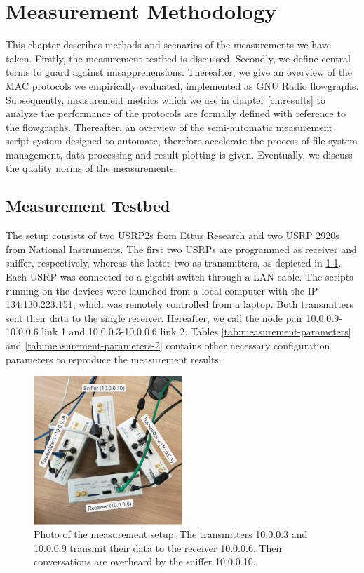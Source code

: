 \chapter{Measurement Methodology}
\label{ch:methodology}

This chapter describes methods and scenarios of the measurements we have taken. Firstly, the measurement testbed is discussed. Secondly, we define central terms to guard against misapprehensions. Thereafter, we give an overview of the MAC protocols we empirically evaluated, implemented as GNU Radio flowgraphs. Subsequently, measurement metrics which we use in chapter \ref{ch:results} to analyze the performance of the protocols are formally defined with reference to the flowgraphs. Thereafter, an overview of the semi-automatic measurement script system designed to automate, therefore accelerate the process of file system management, data processing and result plotting is given. Eventually, we discuss the quality norms of the measurements.

\section{Measurement Testbed}

The setup consists of two USRP2s from Ettus Research and two USRP 2920s from National Instruments. The first two USRPs are programmed as receiver and sniffer, respectively, whereas the latter two as transmitters, as depicted in \ref{fig:measurement-setup}. Each USRP was connected to a gigabit switch through a LAN cable. The scripts running on the devices were launched from a local computer with the IP 134.130.223.151, which was remotely controlled from a laptop. Both transmitters sent their data to the single receiver. Hereafter, we call the node pair 10.0.0.9-10.0.0.6 link 1 and 10.0.0.3-10.0.0.6 link 2. Tables \ref{tab:measurement-parameters} and \ref{tab:measurement-parameters-2}  contains other necessary configuration parameters to reproduce the measurement results.

\begin{figure}[tb]
	\label{fig:measurement-setup}
	\begin{center}
		\includegraphics[width=0.5\textwidth]{pictures/measurement_setup}
	\end{center}
	\caption[Photo of the measurement setup.]{Photo of the measurement setup. The transmitters 10.0.0.3 and 10.0.0.9 transmit their data to the receiver 10.0.0.6. Their conversations are overheard by the sniffer 10.0.0.10.}
\end{figure}

